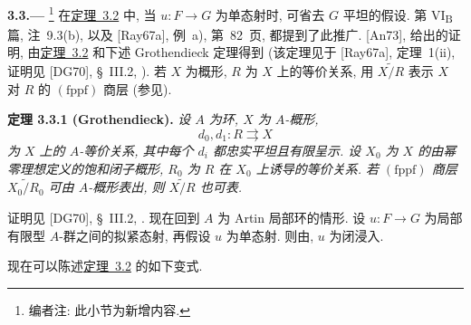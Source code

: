 
\medskip
{}\label{par:sga3-VIA-3.3}%
\noindent\textbf{3.3.---}%
\footnote{\label{note:sga3-VIA-42}编者注: 此小节为新增内容.}
在\hyperref[thm:sga3-VIA-3.2]{定理~3.2} 中,
当 \(u:F\to G\) 为单态射时, 可省去 \(G\) 平坦的假设.
第 VI\textsubscript{B} 篇, 注~9.3(b),
以及 \textup{[Ray67a]}, 例~a), 第~82~页,
都提到了此推广. \textup{[An73]},  给出的证明,
由\hyperref[thm:sga3-VIA-3.2]{定理~3.2} 和下述 Grothendieck 定理得到
(该定理见于 \textup{[Ray67a]}, 定理~1(ii),
证明见 \textup{[DG70]}, \S~III.2, ).
若 \(X\) 为概形, \(R\) 为 \(X\) 上的等价关系,
用 \(\widetilde{X/R}\) 表示 \(X\) 对 \(R\) 的 \((\mathrm{fppf})\) 商层
(参见).

\medskip
{}\label{thm:sga3-VIA-3.3.1}%
\noindent\textbf{定理 3.3.1 (Grothendieck).}
\textit{设 \(A\) 为环, \(X\) 为 \(A\)-概形,
\[
  d_0,d_1:R\rightrightarrows X
\]
为 \(X\) 上的 \(A\)-等价关系, 其中每个 \(d_i\) 都忠实平坦且有限呈示.
设 \(X_0\) 为 \(X\) 的由幂零理想定义的饱和闭子概形,
\(R_0\) 为 \(R\) 在 \(X_0\) 上诱导的等价关系.
若 \((\mathrm{fppf})\) 商层 \(\widetilde{X_0/R_0}\) 可由 \(A\)-概形表出,
则 \(\widetilde{X/R}\) 也可表.}

证明见 \textup{[DG70]}, \S~III.2, .
现在回到 \(A\) 为 Artin 局部环的情形.
设 \(u:F\to G\) 为局部有限型 \(A\)-群之间的拟紧态射,
再假设 \(u\) 为单态射.
则由, \(u\) 为闭浸入.

现在可以陈述\hyperref[thm:sga3-VIA-3.2]{定理~3.2} 的如下变式.


